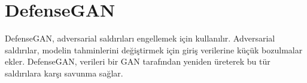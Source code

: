 \section{DefenseGAN}

DefenseGAN, adversarial saldırıları engellemek için kullanılır. Adversarial saldırılar, modelin tahminlerini değiştirmek için giriş verilerine küçük bozulmalar ekler. DefenseGAN, verileri bir GAN tarafından yeniden üreterek bu tür saldırılara karşı savunma sağlar. 

\newpage